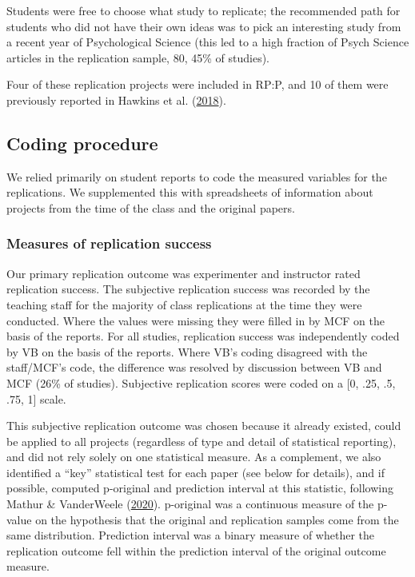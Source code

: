 \documentclass[
  english,
  a4paper,
]{article}
\begin{document}
Students were free to choose what study to replicate; the recommended path for students who did not have their own ideas was to pick an interesting study from a recent year of Psychological Science (this led to a high fraction of Psych Science articles in the replication sample, 80, 45\% of studies).

Four of these replication projects were included in RP:P, and 10 of them were previously reported in Hawkins et al. (\protect\hyperlink{ref-hawkins2018}{2018}).

\hypertarget{coding-procedure}{%
\subsection{Coding procedure}\label{coding-procedure}}

We relied primarily on student reports to code the measured variables for the replications. We supplemented this with spreadsheets of information about projects from the time of the class and the original papers.

\hypertarget{measures-of-replication-success}{%
\subsubsection{Measures of replication success}\label{measures-of-replication-success}}

Our primary replication outcome was experimenter and instructor rated replication success. The subjective replication success was recorded by the teaching staff for the majority of class replications at the time they were conducted. Where the values were missing they were filled in by MCF on the basis of the reports. For all studies, replication success was independently coded by VB on the basis of the reports. Where VB's coding disagreed with the staff/MCF's code, the difference was resolved by discussion between VB and MCF (26\% of studies). Subjective replication scores were coded on a {[}0, .25, .5, .75, 1{]} scale.

This subjective replication outcome was chosen because it already existed, could be applied to all projects (regardless of type and detail of statistical reporting), and did not rely solely on one statistical measure. As a complement, we also identified a ``key'' statistical test for each paper (see below for details), and if possible, computed p-original and prediction interval at this statistic, following Mathur \& VanderWeele (\protect\hyperlink{ref-mathur2020}{2020}). p-original was a continuous measure of the p-value on the hypothesis that the original and replication samples come from the same distribution. Prediction interval was a binary measure of whether the replication outcome fell within the prediction interval of the original outcome measure.
\end{document}

